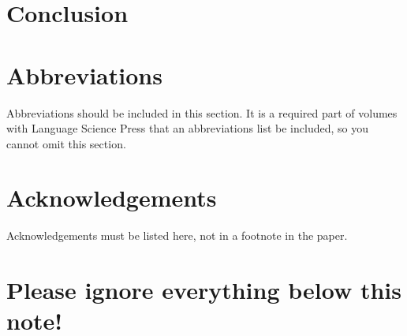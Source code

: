 \documentclass[output=paper,colorlinks,citecolor=brown,
]{langscibook}
\begin{document}
\section{Conclusion}


\section*{Abbreviations}

Abbreviations should be included in this section. It is a required part of volumes with Language Science Press that an abbreviations list be included, so you cannot omit this section.

\section*{Acknowledgements}

Acknowledgements must be listed here, not in a footnote in the paper.

\section{Please ignore everything below this note!}

\sloppy %
\printbibliography[heading=subbibliography,notkeyword=this]
\end{document}
